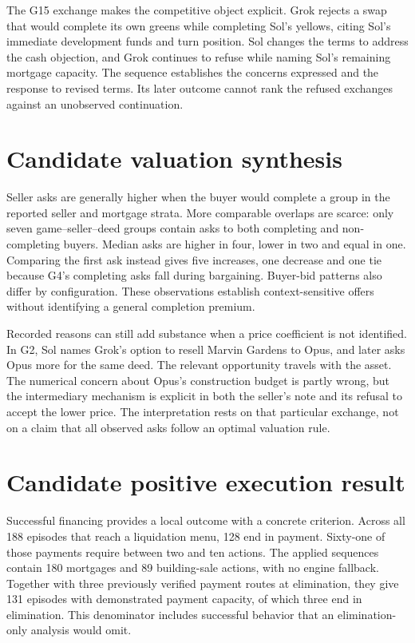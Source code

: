 The G15 exchange makes the competitive object explicit. Grok rejects a swap
that would complete its own greens while completing Sol's yellows, citing
Sol's immediate development funds and turn position. Sol changes the terms
to address the cash objection, and Grok continues to refuse while naming
Sol's remaining mortgage capacity. The sequence establishes the concerns
expressed and the response to revised terms. Its later outcome cannot rank
the refused exchanges against an unobserved continuation.

\section*{Candidate valuation synthesis}

Seller asks are generally higher when the buyer would complete a group in
the reported seller and mortgage strata. More comparable overlaps are scarce:
only seven game--seller--deed groups contain asks to both completing and
non-completing buyers. Median asks are higher in four, lower in two and equal
in one. Comparing the first ask instead gives five increases, one decrease
and one tie because G4's completing asks fall during bargaining. Buyer-bid
patterns also differ by configuration. These observations establish
context-sensitive offers without identifying a general completion premium.

Recorded reasons can still add substance when a price coefficient is not
identified. In G2, Sol names Grok's option to resell Marvin Gardens to Opus,
and later asks Opus more for the same deed. The relevant opportunity travels
with the asset. The numerical concern about Opus's construction budget is
partly wrong, but the intermediary mechanism is explicit in both the seller's
note and its refusal to accept the lower price. The interpretation rests on
that particular exchange, not on a claim that all observed asks follow an
optimal valuation rule.

\section*{Candidate positive execution result}

Successful financing provides a local outcome with a concrete criterion.
Across all 188 episodes that reach a liquidation menu, 128 end in payment.
Sixty-one of those payments require between two and ten actions. The applied
sequences contain 180 mortgages and 89 building-sale actions, with no engine
fallback. Together with three previously verified payment routes at
elimination, they give 131 episodes with demonstrated payment capacity, of
which three end in elimination. This denominator includes successful behavior
that an elimination-only analysis would omit.

